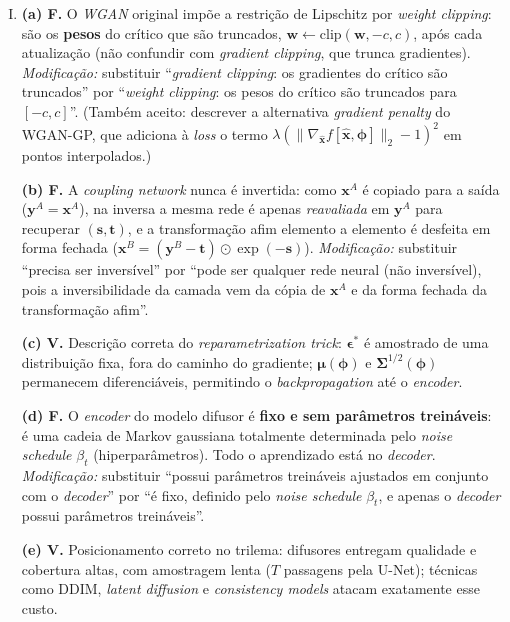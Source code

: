 \documentclass{dlproblemset}
\begin{document}
\begin{enumerate}[I)]
    \item \textbf{(a) F.} O \textit{WGAN} original impõe a restrição de Lipschitz por \textit{weight clipping}: são os \textbf{pesos} do crítico que são truncados, $\mathbf{w} \leftarrow \mathrm{clip}(\mathbf{w}, -c, c)$, após cada atualização (não confundir com \textit{gradient clipping}, que trunca gradientes). \textit{Modificação:} substituir ``\textit{gradient clipping}: os gradientes do crítico são truncados'' por ``\textit{weight clipping}: os pesos do crítico são truncados para $[-c, c]$''. (Também aceito: descrever a alternativa \textit{gradient penalty} do WGAN-GP, que adiciona à \emph{loss} o termo $\lambda(\|\nabla_{\hat{\mathbf{x}}} f[\hat{\mathbf{x}},\boldsymbol{\phi}]\|_2 - 1)^2$ em pontos interpolados.)

    \textbf{(b) F.} A \textit{coupling network} nunca é invertida: como $\mathbf{x}^{A}$ é copiado para a saída ($\mathbf{y}^{A} = \mathbf{x}^{A}$), na inversa a mesma rede é apenas \emph{reavaliada} em $\mathbf{y}^{A}$ para recuperar $(\mathbf{s}, \mathbf{t})$, e a transformação afim elemento a elemento é desfeita em forma fechada ($\mathbf{x}^{B} = (\mathbf{y}^{B} - \mathbf{t})\odot\exp(-\mathbf{s})$). \textit{Modificação:} substituir ``precisa ser inversível'' por ``pode ser qualquer rede neural (não inversível), pois a inversibilidade da camada vem da cópia de $\mathbf{x}^{A}$ e da forma fechada da transformação afim''.

    \textbf{(c) V.} Descrição correta do \textit{reparametrization trick}: $\boldsymbol{\epsilon}^{*}$ é amostrado de uma distribuição fixa, fora do caminho do gradiente; $\boldsymbol{\mu}(\boldsymbol{\phi})$ e $\boldsymbol{\Sigma}^{1/2}(\boldsymbol{\phi})$ permanecem diferenciáveis, permitindo o \textit{backpropagation} até o \textit{encoder}.

    \textbf{(d) F.} O \textit{encoder} do modelo difusor é \textbf{fixo e sem parâmetros treináveis}: é uma cadeia de Markov gaussiana totalmente determinada pelo \textit{noise schedule} $\beta_t$ (hiperparâmetros). Todo o aprendizado está no \textit{decoder}. \textit{Modificação:} substituir ``possui parâmetros treináveis ajustados em conjunto com o \textit{decoder}'' por ``é fixo, definido pelo \textit{noise schedule} $\beta_t$, e apenas o \textit{decoder} possui parâmetros treináveis''.

    \textbf{(e) V.} Posicionamento correto no trilema: difusores entregam qualidade e cobertura altas, com amostragem lenta ($T$ passagens pela U-Net); técnicas como DDIM, \textit{latent diffusion} e \textit{consistency models} atacam exatamente esse custo.


\end{enumerate}
\end{document}
